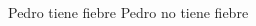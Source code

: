 \documentclass[12pt,addpoints]{evalua}
\begin{document}
\begin{questions}
\begin{multicols}{2}
\begin{parts}
                  \begin{oneparcheckboxes}
                        \CorrectChoice Pedro tiene fiebre \choice Pedro no tiene fiebre
                  \end{oneparcheckboxes}





            \end{parts}
      \end{multicols}
\end{questions}
\end{document}
